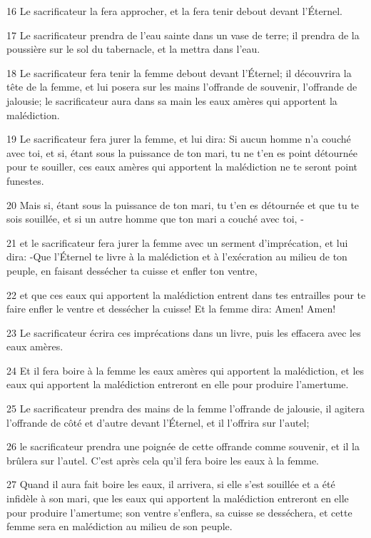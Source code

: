 \par 16 Le sacrificateur la fera approcher, et la fera tenir debout devant l'Éternel.
\par 17 Le sacrificateur prendra de l'eau sainte dans un vase de terre; il prendra de la poussière sur le sol du tabernacle, et la mettra dans l'eau.
\par 18 Le sacrificateur fera tenir la femme debout devant l'Éternel; il découvrira la tête de la femme, et lui posera sur les mains l'offrande de souvenir, l'offrande de jalousie; le sacrificateur aura dans sa main les eaux amères qui apportent la malédiction.
\par 19 Le sacrificateur fera jurer la femme, et lui dira: Si aucun homme n'a couché avec toi, et si, étant sous la puissance de ton mari, tu ne t'en es point détournée pour te souiller, ces eaux amères qui apportent la malédiction ne te seront point funestes.
\par 20 Mais si, étant sous la puissance de ton mari, tu t'en es détournée et que tu te sois souillée, et si un autre homme que ton mari a couché avec toi, -
\par 21 et le sacrificateur fera jurer la femme avec un serment d'imprécation, et lui dira: -Que l'Éternel te livre à la malédiction et à l'exécration au milieu de ton peuple, en faisant dessécher ta cuisse et enfler ton ventre,
\par 22 et que ces eaux qui apportent la malédiction entrent dans tes entrailles pour te faire enfler le ventre et dessécher la cuisse! Et la femme dira: Amen! Amen!
\par 23 Le sacrificateur écrira ces imprécations dans un livre, puis les effacera avec les eaux amères.
\par 24 Et il fera boire à la femme les eaux amères qui apportent la malédiction, et les eaux qui apportent la malédiction entreront en elle pour produire l'amertume.
\par 25 Le sacrificateur prendra des mains de la femme l'offrande de jalousie, il agitera l'offrande de côté et d'autre devant l'Éternel, et il l'offrira sur l'autel;
\par 26 le sacrificateur prendra une poignée de cette offrande comme souvenir, et il la brûlera sur l'autel. C'est après cela qu'il fera boire les eaux à la femme.
\par 27 Quand il aura fait boire les eaux, il arrivera, si elle s'est souillée et a été infidèle à son mari, que les eaux qui apportent la malédiction entreront en elle pour produire l'amertume; son ventre s'enflera, sa cuisse se desséchera, et cette femme sera en malédiction au milieu de son peuple.

